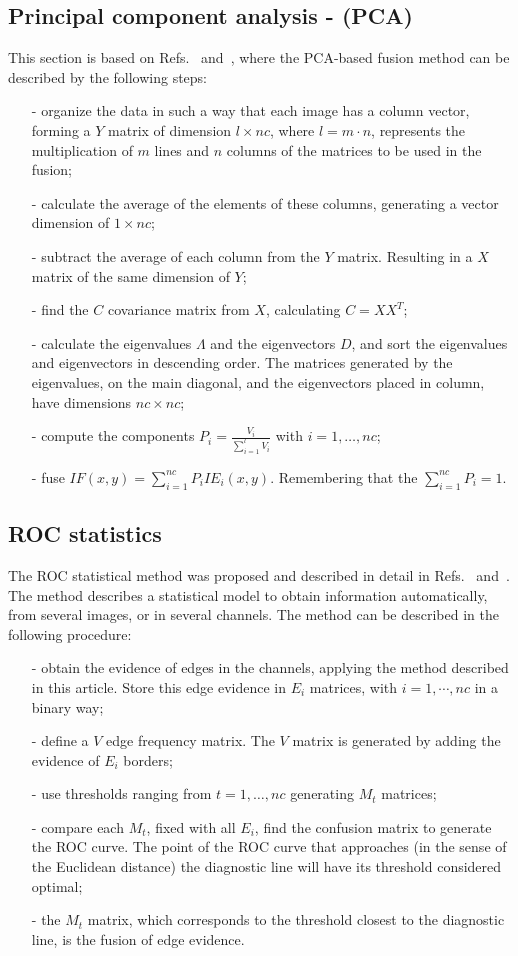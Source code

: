 \documentclass[conference]{IEEEtran}
\begin{document}
\subsection{Principal component analysis - (PCA) }
This section is based on Refs.~\cite{n_r} and~\cite{mit}, where the PCA-based fusion method can be described by the following steps:
\begin{itemize}
\item[-] organize the data in such a way that each image has a column vector, forming a $Y$ matrix of dimension $l\times nc$, where $l=m\cdot n$, represents the multiplication of $m$ lines and $n$ columns of the matrices to be used in the fusion;
\item[-] calculate the average of the elements of these columns, generating a vector dimension of $1\times nc$;
\item[-] subtract the average of each column from the $Y$ matrix. Resulting in a $X$ matrix of the same dimension of $Y$; 
\item[-] find the $C$ covariance matrix from $X$, calculating $C=XX^T$;
\item[-] calculate the eigenvalues $\Lambda$ and the eigenvectors $D$, and sort the eigenvalues and eigenvectors in descending order. The matrices generated by the eigenvalues, on the main diagonal, and the eigenvectors placed in column, have dimensions $nc\times nc$;
\item[-] compute the components $P_i=\frac{V_i}{\sum_{i=1}^l V_i}$ with $i=1,\dots,nc$;
\item[-] fuse $IF(x,y)=\sum_{i=1}^{nc}P_iIE_i(x,y)$. Remembering that the $\sum_{i=1}^{nc}P_i=1$.
\end{itemize}

\subsection{ROC statistics}
The ROC statistical method was proposed and described in detail in Refs.~\cite{gs} and~\cite{fawcett}. The method describes a statistical model to obtain information automatically, from several images, or in several channels. The method can be described in the following procedure:
\begin{itemize}
\item[-] obtain the evidence of edges in the channels, applying the method described in this article. Store this edge evidence in $E_i$ matrices, with $i=1,\cdots,nc$ in a binary way;
\item[-] define a $V$ edge frequency matrix. The $V$ matrix is generated by adding the evidence of $E_i$ borders;
\item[-] use thresholds ranging from $t=1,\dots,nc$ generating $M_t$ matrices;
\item[-] compare each $M_t$, fixed with all $E_i$, find the confusion matrix to generate the ROC curve. The point of the ROC curve that approaches (in the sense of the Euclidean distance) the diagnostic line will have its threshold considered optimal;
\item[-] the $M_t$ matrix, which corresponds to the threshold closest to the diagnostic line, is the fusion of edge evidence.
\end{itemize}
\end{document}
